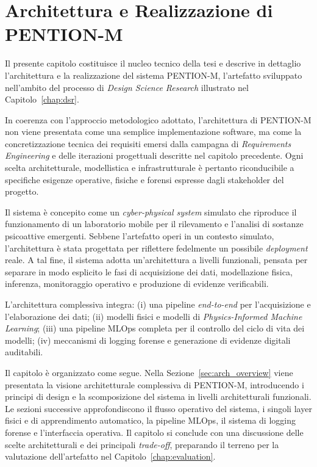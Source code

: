 
\chapter{Architettura e Realizzazione di \textsc{PENTION-M}}
\label{chap:architecture}

Il presente capitolo costituisce il nucleo tecnico della tesi e descrive in dettaglio l’architettura e la realizzazione del sistema \textsc{PENTION-M}, l’artefatto sviluppato nell’ambito del processo di \emph{Design Science Research} illustrato nel Capitolo~\ref{chap:dsr}.

In coerenza con l’approccio metodologico adottato, l’architettura di \textsc{PENTION-M} non viene presentata come una semplice implementazione software, ma come la concretizzazione tecnica dei requisiti emersi dalla campagna di \emph{Requirements Engineering} e delle iterazioni progettuali descritte nel capitolo precedente.
Ogni scelta architetturale, modellistica e infrastrutturale è pertanto riconducibile a specifiche esigenze operative, fisiche e forensi espresse dagli stakeholder del progetto.

Il sistema è concepito come un \emph{cyber-physical system} simulato che riproduce il funzionamento di un laboratorio mobile per il rilevamento e l’analisi di sostanze psicoattive emergenti.
Sebbene l’artefatto operi in un contesto simulato, l’architettura è stata progettata per riflettere fedelmente un possibile \textit{deployment} reale.
A tal fine, il sistema adotta un’architettura a livelli funzionali, pensata per separare in modo esplicito le fasi di acquisizione dei dati, modellazione fisica, inferenza, monitoraggio operativo e produzione di evidenze verificabili.

L’architettura complessiva integra:
(i) una pipeline \textit{end-to-end} per l’acquisizione e l’elaborazione dei dati;
(ii) modelli fisici e modelli di \emph{Physics-Informed Machine Learning};
(iii) una pipeline MLOps completa per il controllo del ciclo di vita dei modelli;
(iv) meccanismi di logging forense e generazione di evidenze digitali auditabili.

Il capitolo è organizzato come segue.
Nella Sezione~\ref{sec:arch_overview} viene presentata la visione architetturale complessiva di \textsc{PENTION-M}, introducendo i principi di design e la scomposizione del sistema in livelli architetturali funzionali.
Le sezioni successive approfondiscono il flusso operativo del sistema, i singoli layer fisici e di apprendimento automatico, la pipeline MLOps, il sistema di logging forense e l’interfaccia operativa.
Il capitolo si conclude con una discussione delle scelte architetturali e dei principali \textit{trade-off}, preparando il terreno per la valutazione dell’artefatto nel Capitolo~\ref{chap:evaluation}.

